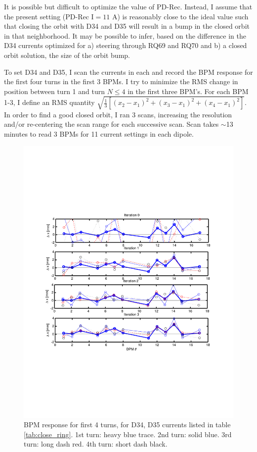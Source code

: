 It is possible but difficult to optimize the value of PD-Rec. Instead, I assume that the present setting (PD-Rec I$=11$ A) is reasonably close to the ideal value such that closing the orbit with D34 and D35 will result in a bump in the closed orbit in that neighborhood. It may be possible to infer, based on the difference in the D34 currents optimized for a) steering through RQ69 and RQ70 and b) a closed orbit solution, the size of the orbit bump. 

To set D34 and D35, I scan the currents in each and record the BPM response for the first four turns in the first 3 BPMs. I try to minimize the RMS change in position between turn 1 and turn $N\le4$ in the first three BPM's. For each BPM 1-3, I define an RMS quantity $\sqrt{\frac{1}{3}\left[ \left(x_2-x_1\right)^2+\left(x_3-x_1\right)^2+\left(x_4-x_1\right)^2\right]}$. In order to find a good closed orbit, I ran 3 scans, increasing the resolution and/or re-centering the scan range for each successive scan. Scan takes $\sim$13 minutes to read 3 BPMs for 11 current settings in each dipole. 

\begin{figure}[htb]
\centering
\includegraphics[width=\textwidth,trim={.5in 2.7in .5in 2.7in},clip]{3.figures/closing_orbit_BPMs.pdf}
\caption{BPM response for first 4 turns, for D34, D35 currents listed in table \ref{tab:close_ring}. 1st turn: heavy blue trace. 2nd turn: solid blue. 3rd turn: long dash red. 4th turn: short dash black.}
\label{fig:close_BPMs}
\end{figure}

